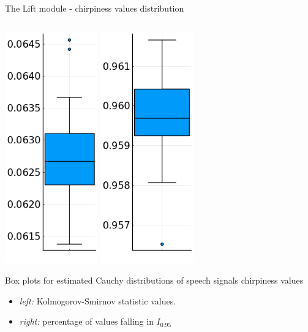 \documentclass[10pt,american,ignorenonframetext,aspectratio=1610]{beamer}
\providecommand{\tightlist}{%
  \setlength{\itemsep}{0pt}\setlength{\parskip}{0pt}}
\theoremstyle{remark}
\begin{document}
\begin{frame}{The Lift module - chirpiness values distribution}
\begin{columns}[T]
\begin{column}{0.5\textwidth}
\begin{center}\centering
\includegraphics[width=0.3\textwidth]{img/cauchy_pt_estimate_iqr_2.png}
\includegraphics[width=0.3\textwidth]{img/cauchy_values_percentage_iqr_2.png}
\end{center}

Box plots for estimated Cauchy distributions of speech signals
chirpiness values

\begin{itemize}
\tightlist
\item
  \emph{left:} Kolmogorov-Smirnov statistic values.
\item
  \emph{right:} percentage of values falling in \(I_{0.95}\)
\end{itemize}
\end{column}
\end{columns}

\end{frame}
\end{document}
